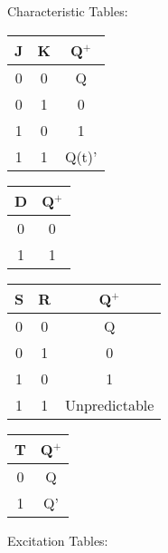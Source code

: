 \documentclass[a4paper]{article}
\begin{document}
\begin{justifying}
\begin{multicols}{2}
            Characteristic Tables:
            
            \begin{multicols}{2}
                \begin{center}
                    \begin{tabular}{cc|c}
                        J & K & Q$^+$ \\
                        \hline
                        0 & 0 & Q \\
                        0 & 1 & 0 \\
                        1 & 0 & 1 \\
                        1 & 1 & Q(t)' \\
                    \end{tabular}
                    
                    \begin{tabular}{c|c}
                        D & Q$^+$ \\
                        \hline
                        0 & 0 \\
                        1 & 1 \\
                    \end{tabular}
                
                    \begin{tabular}{cc|c}
                        S & R & Q$^+$ \\
                        \hline
                        0 & 0 & Q \\
                        0 & 1 & 0 \\
                        1 & 0 & 1 \\
                        1 & 1 & Unpredictable \\
                    \end{tabular}
                
                    \begin{tabular}{c|c}
                        T & Q$^+$ \\
                        \hline
                        0 & Q \\
                        1 & Q' \\
                    \end{tabular}
                \end{center}
            \end{multicols}
           
            Excitation Tables:
            

\end{multicols}
\end{justifying}
\end{document}
